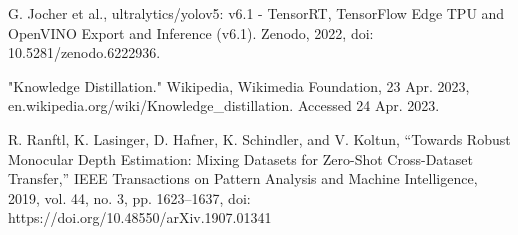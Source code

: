 \begin{thebibliography}{00}
 G. Jocher et al., ultralytics/yolov5: v6.1 - TensorRT, TensorFlow Edge TPU and OpenVINO Export and Inference (v6.1). Zenodo, 2022, doi: 10.5281/zenodo.6222936.

 "Knowledge Distillation." Wikipedia, Wikimedia Foundation, 23 Apr. 2023, en.wikipedia.org/wiki/Knowledge\_distillation. Accessed 24 Apr. 2023.

 R. Ranftl, K. Lasinger, D. Hafner, K. Schindler, and V. Koltun, ``Towards Robust Monocular Depth Estimation: Mixing Datasets for Zero-Shot Cross-Dataset Transfer,'' IEEE Transactions on Pattern Analysis and Machine Intelligence, 2019, vol. 44, no. 3, pp. 1623–1637, doi: https://doi.org/10.48550/arXiv.1907.01341

\end{thebibliography}
\vspace{12pt}

